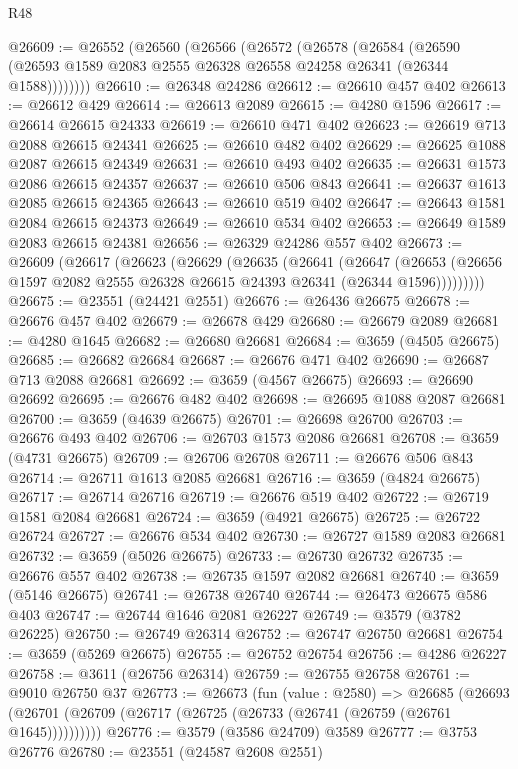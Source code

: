 \begin{lexlean}{R48}
\begin{coremodule}
@26609 := @26552
    (@26560
      (@26566
        (@26572
          (@26578
            (@26584
              (@26590 (@26593 @1589 @2083 @2555 @26328 @26558 @24258 @26341 (@26344 @1588))))))))
@26610 := @26348 @24286
@26612 := @26610 @457 @402
@26613 := @26612 @429
@26614 := @26613 @2089
@26615 := @4280 @1596
@26617 := @26614 @26615 @24333
@26619 := @26610 @471 @402
@26623 := @26619 @713 @2088 @26615 @24341
@26625 := @26610 @482 @402
@26629 := @26625 @1088 @2087 @26615 @24349
@26631 := @26610 @493 @402
@26635 := @26631 @1573 @2086 @26615 @24357
@26637 := @26610 @506 @843
@26641 := @26637 @1613 @2085 @26615 @24365
@26643 := @26610 @519 @402
@26647 := @26643 @1581 @2084 @26615 @24373
@26649 := @26610 @534 @402
@26653 := @26649 @1589 @2083 @26615 @24381
@26656 := @26329 @24286 @557 @402
@26673 := @26609
    (@26617
      (@26623
        (@26629
          (@26635
            (@26641
              (@26647
                (@26653 (@26656 @1597 @2082 @2555 @26328 @26615 @24393 @26341 (@26344 @1596)))))))))
@26675 := @23551 (@24421 @2551)
@26676 := @26436 @26675
@26678 := @26676 @457 @402
@26679 := @26678 @429
@26680 := @26679 @2089
@26681 := @4280 @1645
@26682 := @26680 @26681
@26684 := @3659 (@4505 @26675)
@26685 := @26682 @26684
@26687 := @26676 @471 @402
@26690 := @26687 @713 @2088 @26681
@26692 := @3659 (@4567 @26675)
@26693 := @26690 @26692
@26695 := @26676 @482 @402
@26698 := @26695 @1088 @2087 @26681
@26700 := @3659 (@4639 @26675)
@26701 := @26698 @26700
@26703 := @26676 @493 @402
@26706 := @26703 @1573 @2086 @26681
@26708 := @3659 (@4731 @26675)
@26709 := @26706 @26708
@26711 := @26676 @506 @843
@26714 := @26711 @1613 @2085 @26681
@26716 := @3659 (@4824 @26675)
@26717 := @26714 @26716
@26719 := @26676 @519 @402
@26722 := @26719 @1581 @2084 @26681
@26724 := @3659 (@4921 @26675)
@26725 := @26722 @26724
@26727 := @26676 @534 @402
@26730 := @26727 @1589 @2083 @26681
@26732 := @3659 (@5026 @26675)
@26733 := @26730 @26732
@26735 := @26676 @557 @402
@26738 := @26735 @1597 @2082 @26681
@26740 := @3659 (@5146 @26675)
@26741 := @26738 @26740
@26744 := @26473 @26675 @586 @403
@26747 := @26744 @1646 @2081 @26227
@26749 := @3579 (@3782 @26225)
@26750 := @26749 @26314
@26752 := @26747 @26750 @26681
@26754 := @3659 (@5269 @26675)
@26755 := @26752 @26754
@26756 := @4286 @26227
@26758 := @3611 (@26756 @26314)
@26759 := @26755 @26758
@26761 := @9010 @26750 @37
@26773 := @26673
    (fun (value : @2580) =>
    @26685 (@26693 (@26701 (@26709 (@26717 (@26725 (@26733 (@26741 (@26759 (@26761 @1645))))))))))
@26776 := @3579 (@3586 @24709) @3589
@26777 := @3753 @26776
@26780 := @23551 (@24587 @2608 @2551)

\end{coremodule}
\end{lexlean}
